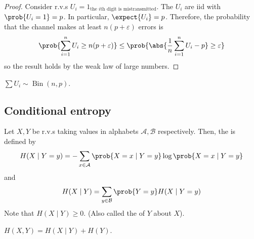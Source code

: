 \begin{proof}
    Consider r.v.s $U_i = 1_\text{the $i$th digit is mistransmitted}$.
    The $U_i$ are iid with $\prob{U_i = 1} = p$.
    In particular, $\expect{U_i} = p$.
    Therefore, the probability that the channel makes at least $n(p + \varepsilon)$ errors is
    \begin{align*}
        \prob{\sum_{i=1}^n U_i \geq n(p + \varepsilon)} \leq \prob{\abs{\frac{1}{n} \sum_{i=1}^n U_i - p} \geq \varepsilon}
    \end{align*}
    so the result holds by the weak law of large numbers.
\end{proof}

\begin{remark}
    $\sum U_i \sim \operatorname{Bin}(n, p)$.
\end{remark}

\subsection{Conditional entropy}
\begin{definition}
    Let $X, Y$ be r.v.s taking values in alphabets $\mathcal A, \mathcal B$ respectively.
    Then, the  is defined by
    \begin{align*}
        H(X \mid Y = y) = - \sum_{x \in \mathcal A} \prob{X = x \mid Y = y} \log \prob{X = x \mid Y = y}
    \end{align*}
    and
    \begin{align*}
        H(X \mid Y) = \sum_{y \in \mathcal B} \prob{Y = y} H(X \mid Y = y)
    \end{align*}
    Note that $H(X \mid Y) \geq 0$. (Also called the  of $Y$ about $X$).
\end{definition}

\begin{lemma}
    $H(X,Y) = H(X \mid Y) + H(Y)$.
\end{lemma}

